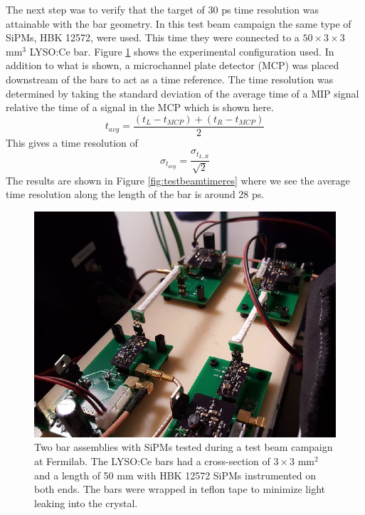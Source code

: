 The next step was to verify that the target of 30 ps time resolution was attainable with the bar geometry.  In this test beam campaign the same type of SiPMs, HBK 12572, were used.  This time they were connected to a $50 \times 3 \times 3$ mm$^3$ LYSO:Ce bar.  Figure \ref{fig:testbeam2} shows the experimental configuration used.  In addition to what is shown, a microchannel plate detector (MCP) was placed downstream of the bars to act as a time reference.  The time resolution was determined by taking the standard deviation of the average time of a MIP signal relative the time of a signal in the MCP which is shown here.
\begin{equation}
	t_{avg} = \frac{(t_L - t_{MCP})+(t_R - t_{MCP})}{2}
\end{equation}
This gives a time resolution of 
\begin{equation}
	\sigma_{t_{avg}} = \frac{\sigma_{t_{L,R}}}{\sqrt{2}}
\end{equation}
The results are shown in Figure \ref{fig:testbeamtimeres} where we see the average time resolution along the length of the bar is around 28 ps.
\begin{figure}[h]
	\centering
	\includegraphics[width=0.7\linewidth]{Figures/Testbeam2}
	\caption[Test beam setup at Fermilab for verifying time resolution capabilities.]{Two bar assemblies with SiPMs tested during a test beam campaign at Fermilab.  The LYSO:Ce bars had a cross-section of $3 \times 3$ mm$^2$ and a length of 50 mm with HBK 12572 SiPMs instrumented on both ends.  The bars were wrapped in teflon tape to minimize light leaking into the crystal.}
	\label{fig:testbeam2}
\end{figure}
